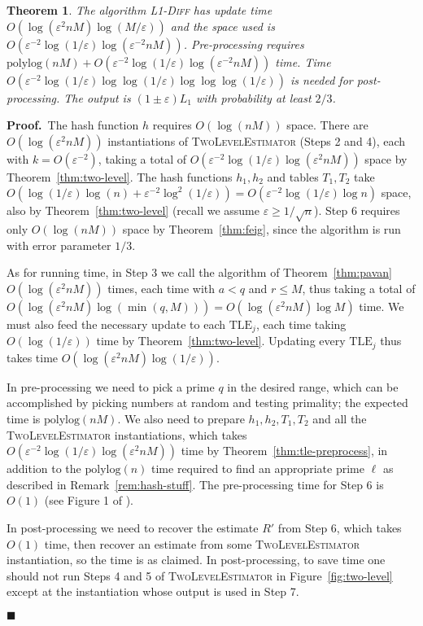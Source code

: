 \documentclass[letterpaper,11pt]{article}
\newcommand{\polylog}{{\mathrm{polylog}}}
\newcommand{\eps}{\varepsilon}
\newcommand{\TLE}{\mathrm{TLE}}
\newcommand{\TheoremName}[1]{\label{thm:#1}}
\newcommand{\Remark}[1]{Remark~\ref{rem:#1}}
\newcommand{\Theorem}[1]{Theorem~\ref{thm:#1}}
\newcommand{\Figure}[1]{Figure~\ref{fig:#1}}
\newtheorem{theorem}{Theorem}\newtheorem{corollary}[theorem]{Corollary}
\newcommand{\proofbelow}{3pt}
\newcommand{\afterproof}{\hfill $\blacksquare$ \par \vspace{\proofbelow}}
\renewenvironment{proof}{\noindent\textbf{Proof.}\,}{\afterproof}
\begin{document}
\begin{theorem}\TheoremName{main-alg}
The algorithm \textsc{L1-Diff} has update time $O(\log(\eps^2
nM)\log(M/\eps))$ and the space used is
$O(\eps^{-2}\log(1/\eps)\log(\eps^{-2}nM))$.
Pre-processing requires
$\polylog(nM) + O(\eps^{-2}\log(1/\eps)\log(\eps^{-2}nM))$ time.
Time $O(\eps^{-2}\log(1/\eps)\log\log(1/\eps)\log\log\log(1/\eps))$ is
needed for post-processing.
The output is $(1\pm\eps)L_1$ with probability at least $2/3$.
\end{theorem}
\begin{proof}
The hash function $h$ requires $O(\log(nM))$ space.  There are
$O(\log(\eps^2 nM))$ instantiations of \textsc{TwoLevelEstimator}
(Steps 2 and 4), each with $k = O(\eps^{-2})$, taking a total of
$O(\eps^{-2}\log(1/\eps)\log(\eps^2 nM))$ space by
\Theorem{two-level}. The hash functions $h_1,h_2$ and tables $T_1,T_2$
take $O(\log(1/\eps)\log(n) + \eps^{-2}\log^2(1/\eps)) =
O(\eps^{-2}\log(1/\eps)\log n)$ space, also by \Theorem{two-level}
(recall we assume $\eps \ge 1/\sqrt{n}$). Step 6 requires only
$O(\log(nM))$ space by \Theorem{feig}, since the algorithm is run
with error parameter $1/3$.

As for running time, in Step 3 we call the algorithm of
\Theorem{pavan} $O(\log(\eps^2 nM))$ times, each time with $a < q$ and
$r \le M$, thus taking a total of $O(\log(\eps^2 nM)\log(\min(q, M)))
= O(\log(\eps^2 nM)\log M)$ time. We must also feed the necessary
update to each $\TLE_j$, each time taking $O(\log(1/\eps))$ time by
\Theorem{two-level}.  Updating every $\TLE_j$ thus takes time
$O(\log(\eps^2 nM)\log(1/\eps))$.

In pre-processing we need to pick a prime $q$ in the desired range,
which can be accomplished by picking numbers at random and testing
primality; the expected time is $\polylog(nM)$. We also need to
prepare $h_1,h_2,T_1,T_2$ and all the \textsc{TwoLevelEstimator}
instantiations, which takes $O(\eps^{-2}\log(1/\eps)\log(\eps^2 nM))$
time by \Theorem{tle-preprocess}, in addition to the $\polylog(n)$
time required to find an appropriate prime $\ell$ as described in
\Remark{hash-stuff}. The pre-processing time for Step 6
is $O(1)$ (see Figure 1 of \cite{FKSV02}).

In post-processing we need to recover the estimate $R'$ from Step 6,
which takes $O(1)$ time, then recover an estimate from some
\textsc{TwoLevelEstimator} instantiation, so the time is as
claimed. In post-processing, to save time one should not run
Steps 4 and 5 of \textsc{TwoLevelEstimator} in \Figure{two-level}
except at the instantiation whose output is used in Step 7.


\end{proof}
\end{document}

